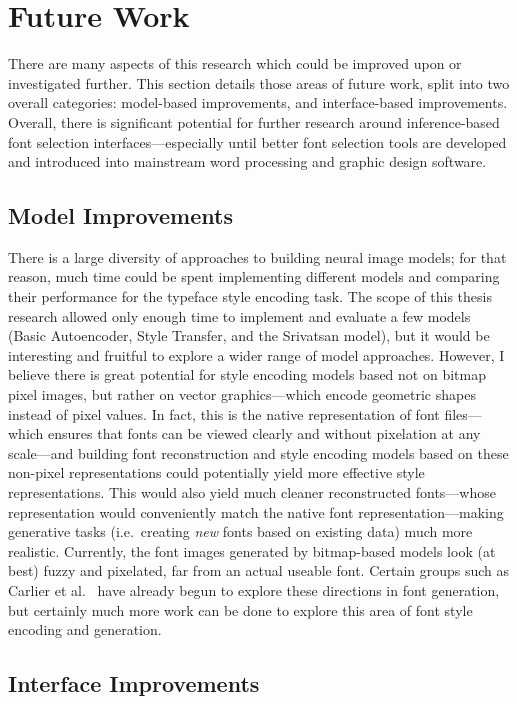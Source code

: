\section{Future Work}

There are many aspects of this research which could be improved upon or investigated further. This section details those areas of future work, split into two overall categories: model-based improvements, and interface-based improvements. Overall, there is significant potential for further research around inference-based font selection interfaces---especially until better font selection tools are developed and introduced into mainstream word processing and graphic design software.

\subsection{Model Improvements}

There is a large diversity of approaches to building neural image models; for that reason, much time could be spent implementing different models and comparing their performance for the typeface style encoding task. The scope of this thesis research allowed only enough time to implement and evaluate a few models (Basic Autoencoder, Style Transfer, and the Srivatsan model), but it would be interesting and fruitful to explore a wider range of model approaches. However, I believe there is great potential for style encoding models based not on bitmap pixel images, but rather on vector graphics---which encode geometric shapes instead of pixel values. In fact, this is the native representation of font files---which ensures that fonts can be viewed clearly and without pixelation at any scale---and building font reconstruction and style encoding models based on these non-pixel representations could potentially yield more effective style representations. This would also yield much cleaner reconstructed fonts---whose representation would conveniently match the native font representation---making generative tasks (i.e.\ creating \textit{new} fonts based on existing data) much more realistic. Currently, the font images generated by bitmap-based models look (at best) fuzzy and pixelated, far from an actual useable font. Certain groups such as Carlier et al.\ \cite{carlier2020} have already begun to explore these directions in font generation, but certainly much more work can be done to explore this area of font style encoding and generation.

\subsection{Interface Improvements}

